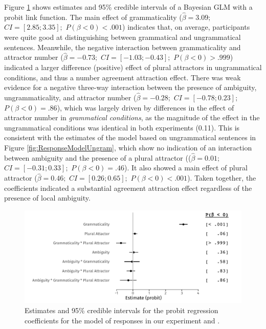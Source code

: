 \documentclass[apacite,linguex]{glossa}\usepackage[]{graphicx}\usepackage[]{color}
\makeatletter
\def\maxwidth{ %
  \ifdim\Gin@nat@width>\linewidth
    \linewidth
  \else
    \Gin@nat@width
  \fi
}
\newenvironment{knitrout}{}{} %
\makeatother
\begin{document}
Figure \ref{fig:ResponseModel} shows estimates and 95\% credible intervals of a Bayesian GLM with a probit link function. The main effect of grammaticality ($\hat{\beta}=3.09;$ $CI=[2.85; 3.35];$ $P(\beta<0)< .001$) indicates that, on average, participants were quite good at distinguishing between grammatical and ungrammatical sentences. Meanwhile, the negative interaction between grammaticality and attractor number ($\hat{\beta}=-0.73;$ $CI=[-1.03; -0.43];$ $P(\beta<0)> .999$) indicated a larger difference (positive) effect of plural attractors in ungrammatical conditions, and thus a number agreement attraction effect. There was weak evidence for a negative three-way interaction between the presence of ambiguity, ungrammaticality, and attractor number ($\hat{\beta}=-0.28;$ $CI=[-0.78; 0.23];$ $P(\beta<0)=    .86$), which was largely driven by differences in the effect of attractor number in \textit{grammatical conditions}, as the magnitude of the effect in the ungrammatical conditions was identical in both experiments (0.11).  
This is consistent with the estimates of the model based on ungrammatical sentences in Figure \ref{fig:ResponseModelUngram}, which show no indication of an interaction between ambiguity and the presence of a plural attractor (($\hat{\beta}=0.01;$ $CI=[-0.31; 0.33];$ $P(\beta<0)=    .46$). It also showed a main effect of plural attractor ($\hat{\beta}=0.46;$ $CI=[0.26; 0.65];$ $P(\beta<0)< .001$). Taken together, the coefficients indicated a substantial agreement attraction effect regardless of the presence of local ambiguity.  



\begin{figure}[hbt!]
\centering


\begin{knitrout}
\color{fgcolor}

{\centering \includegraphics[width=\maxwidth]{figure/ResponseModel-1} 

}


\end{knitrout}

\caption{Estimates and 95\% credible intervals for the probit regression coefficients for the model of responses in our experiment and \citet{LagoEtAl:2019}.}
\label{fig:ResponseModel}
\end{figure}
\end{document}
